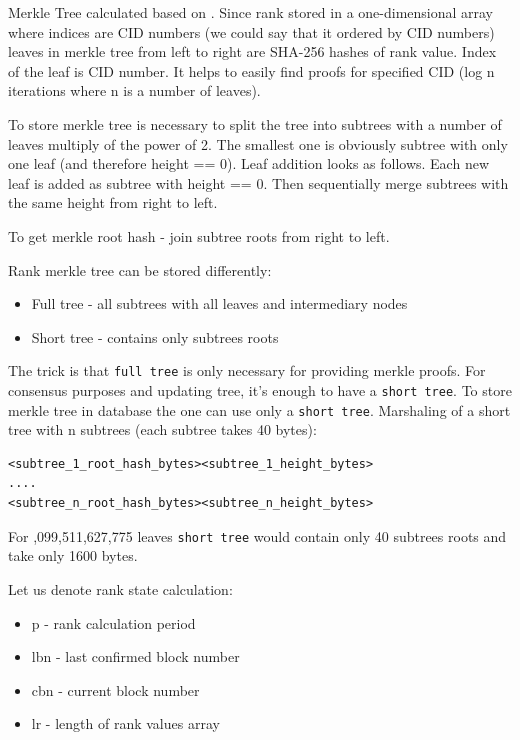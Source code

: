 \documentclass[8pt,oneside]{amsart}
\newcommand{\linkgreen}[2]{\href{#1}{\color{green}{#2}}}
\newcommand{\code}[1]{{\PlayBold #1}}
\begin{document}
Merkle Tree calculated based on \linkgreen{https://tools.ietf.org/html/rfc6962#section-2.1}{RFC-6962 standard}. Since rank stored in a one-dimensional array where indices are CID numbers (we could say that it ordered by CID numbers) leaves in merkle tree from left to right are \code{SHA-256} hashes of rank value. Index of the leaf is CID number. It helps to easily find proofs for specified CID (\code{log n} iterations where \code{n} is a number of leaves).

To store merkle tree is necessary to split the tree into subtrees with a number of leaves multiply of the power of 2. The smallest one is obviously subtree with only one leaf (and therefore \code{height == 0}). Leaf addition looks as follows. Each new leaf is added as subtree with \code{height == 0}. Then sequentially merge subtrees with the same \code{height} from right to left.

To get merkle root hash - join subtree roots from right to left.

Rank merkle tree can be stored differently:

\begin{itemize}
\item[] Full tree - all subtrees with all leaves and intermediary nodes
\item[] Short tree - contains only subtrees roots
\end{itemize}

The trick is that \verb|full tree| is only necessary for providing merkle proofs. For consensus purposes and updating tree, it's enough to have a \verb|short tree|. To store merkle tree in database the one can use only a \verb|short tree|. Marshaling of a short tree with \code{n} subtrees (each subtree takes 40 bytes):

\begin{lstlisting}
<subtree_1_root_hash_bytes><subtree_1_height_bytes>
....
<subtree_n_root_hash_bytes><subtree_n_height_bytes>
\end{lstlisting}

For \code{1,099,511,627,775} leaves \verb|short tree| would contain only 40 subtrees roots and take only 1600 bytes.

Let us denote rank state calculation:

\begin{itemize}
    \item[] \code{p} - rank calculation period
    \item[] \code{lbn} - last confirmed block number
    \item[] \code{cbn} - current block number
    \item[] \code{lr} -  length of rank values array
\end{itemize}
\end{document}
